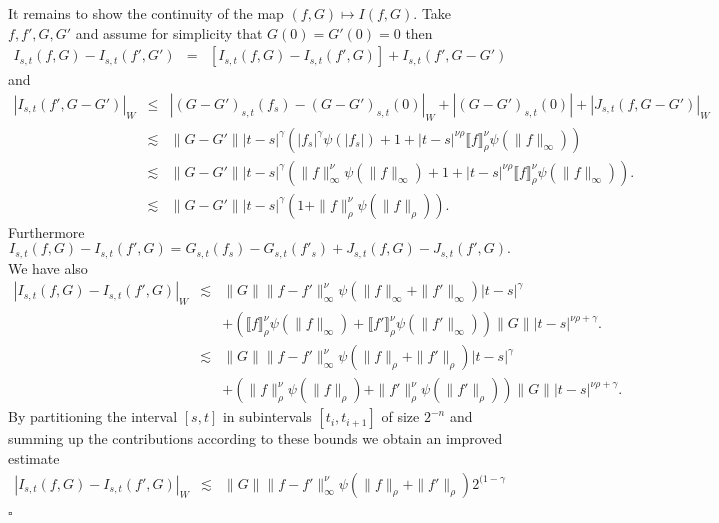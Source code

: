 \documentclass[a4paper,11pt]{article}
\newcommand{\nobracket}{}
\newenvironment{proof}{{\sc Proof.}}{\hfill$\square$}
\begin{document}
\begin{proof}
  
  It remains to show the continuity of the map $(f,G) \mapsto I (f,G)$. Take
  $f,f' ,G,G'$ and assume for simplicity that $G (0) =G' (0) =0$ then
  \begin{eqnarray*}
    I_{s,t} (f,G) -I_{s,t} (f' ,G' ) & = & [I_{s,t} (f,G)-I_{s,t} (f' ,G)]
    +I_{s,t}  (f' ,G-G' )
  \end{eqnarray*}
  and
  \begin{eqnarray*}
    | I_{s,t} (f' ,G-G' ) |_{W} & \leqslant & | (G-G' )_{s,t} (f_{s} )-(G-G'
    )_{s,t} (0) |_{W} + | (G-G' )_{s,t} (0) | + | J_{s,t} (f,G-G' ) |_{W}\\
    & \lesssim & \| G-G' \| | t-s |^{\gamma} ( | f_{s} |^{\gamma} \psi ( |
    f_{s} | ) +1+|t-s|^{\nu \rho} \llbracket f \rrbracket^{\nu}_{\rho} \psi (
    \|f\|_{\infty} ) )\\
    & \lesssim & \| G-G' \| |t-s|^{\gamma}  ( \|f\|_{\infty}^{\nu} \psi (
    \|f\|_{\infty} ) +1+|t-s|^{\nu \rho} \llbracket f \rrbracket^{\nu}_{\rho}
    \psi ( \|f\|_{\infty} ) ) .\\
    & \lesssim & \| G-G' \| |t-s|^{\gamma}  ( 1+ \| f \|^{\nu}_{\rho} \psi (
    \| f \|_{\rho} ) ) .
  \end{eqnarray*}
  Furthermore
  \[ I_{s,t} (f,G) -I_{s,t} (f' ,G) =G_{s,t} (f_{s} ) -G_{s,t} (f'_{s} )
     +J_{s,t} (f,G) -J_{s,t} (f' ,G) . \]
  We have also
  \begin{eqnarray*}
    |I_{s,t} (f,G)-I_{s,t} (f' ,G)|_{W} & \lesssim & \|G\| \|f-f'
    \|^{\nu}_{\infty} \psi ( \| f \|_{\infty} + \| f' \|_{\infty} )
    |t-s|^{\gamma}\\
    &  & + ( \llbracket f \rrbracket^{\nu}_{\rho} \psi ( \| f \|_{\infty} ) +
    \llbracket f' \rrbracket^{\nu}_{\rho} \psi ( \| f' \|_{\infty} ) ) \|G\|
    |t-s|^{\nu \rho + \gamma} .\\
    & \lesssim & \|G\| \|f-f' \|^{\nu}_{\infty} \psi ( \| f \|_{\rho} + \| f'
    \|_{\rho} ) |t-s|^{\gamma}\\
    &  & + ( \| f \|^{\nu}_{\rho} \psi ( \| f \|_{\rho} ) + \nobracket \|
    \nobracket f' \|^{\nu}_{\rho} \psi ( \| f' \|_{\rho} ) ) \|G\| |t-s|^{\nu
    \rho + \gamma} .
  \end{eqnarray*}
  By partitioning the interval $[s,t]$ in subintervals $[t_{i} ,t_{i+1} ]$ of
  size $2^{-n}$ and summing up the contributions according to these bounds we
  obtain an improved estimate
  \begin{eqnarray*}
    |I_{s,t} (f,G)-I_{s,t} (f' ,G)|_{W} & \lesssim & \|G\|  \|f-f'
    \|^{\nu}_{\infty} \psi ( \| f \|_{\rho} + \| f' \|_{\rho} ) 2^{(1- \gamma
}
\end{eqnarray*}
\end{proof}
\end{document}
